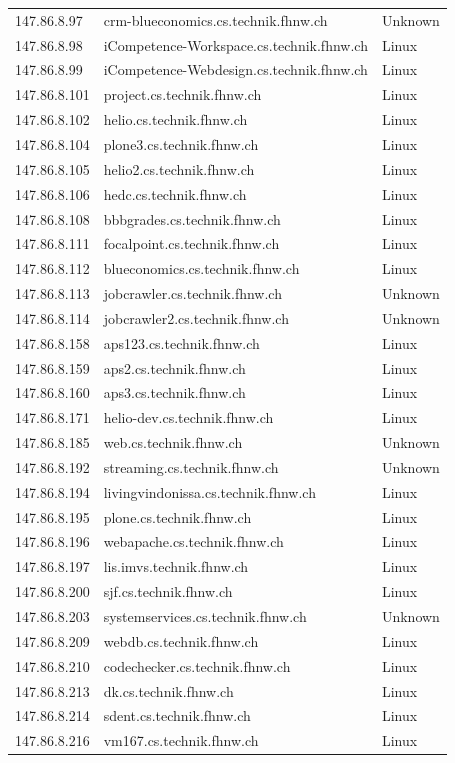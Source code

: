 \documentclass[11pt,a4paper]{scrartcl}
\begin{document}
\begin{longtable}{p{2.5cm}|p{8cm}|l}
	147.86.8.97 & crm-blueconomics.cs.technik.fhnw.ch & Unknown\\
	147.86.8.98 & iCompetence-Workspace.cs.technik.fhnw.ch & Linux\\
	147.86.8.99 & iCompetence-Webdesign.cs.technik.fhnw.ch & Linux\\
	147.86.8.101 & project.cs.technik.fhnw.ch & Linux\\
	147.86.8.102 & helio.cs.technik.fhnw.ch & Linux\\
	147.86.8.104 & plone3.cs.technik.fhnw.ch & Linux\\
	147.86.8.105 & helio2.cs.technik.fhnw.ch & Linux\\
	147.86.8.106 & hedc.cs.technik.fhnw.ch & Linux\\
	147.86.8.108 & bbbgrades.cs.technik.fhnw.ch & Linux\\
	147.86.8.111 & focalpoint.cs.technik.fhnw.ch & Linux\\
	147.86.8.112 & blueconomics.cs.technik.fhnw.ch & Linux\\
	147.86.8.113 & jobcrawler.cs.technik.fhnw.ch & Unknown\\
	147.86.8.114 & jobcrawler2.cs.technik.fhnw.ch & Unknown\\
	147.86.8.158 & aps123.cs.technik.fhnw.ch & Linux\\
	147.86.8.159 & aps2.cs.technik.fhnw.ch & Linux\\
	147.86.8.160 & aps3.cs.technik.fhnw.ch & Linux\\
	147.86.8.171 & helio-dev.cs.technik.fhnw.ch & Linux\\
	147.86.8.185 & web.cs.technik.fhnw.ch & Unknown\\
	147.86.8.192 & streaming.cs.technik.fhnw.ch & Unknown\\
	147.86.8.194 & livingvindonissa.cs.technik.fhnw.ch & Linux\\
	147.86.8.195 & plone.cs.technik.fhnw.ch & Linux\\
	147.86.8.196 & webapache.cs.technik.fhnw.ch & Linux\\
	147.86.8.197 & lis.imvs.technik.fhnw.ch & Linux\\
	147.86.8.200 & sjf.cs.technik.fhnw.ch & Linux\\
	147.86.8.203 & systemservices.cs.technik.fhnw.ch & Unknown\\
	147.86.8.209 & webdb.cs.technik.fhnw.ch & Linux\\
	147.86.8.210 & codechecker.cs.technik.fhnw.ch & Linux\\
	147.86.8.213 & dk.cs.technik.fhnw.ch & Linux\\
	147.86.8.214 & sdent.cs.technik.fhnw.ch & Linux\\
	147.86.8.216 & vm167.cs.technik.fhnw.ch & Linux\\
\end{longtable}
\end{document}
